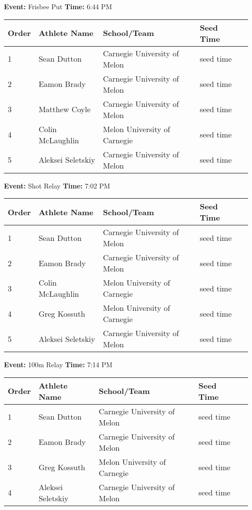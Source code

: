 \documentclass[11pt]{article}
\begin{document}
\textbf{Event:} Frisbee Put \quad \textbf{Time:} 6:44 PM 

\vspace{1em}
\begin{tabular}{@{}lllll@{}}
\toprule

\textbf{Order} & \textbf{Athlete Name} & \textbf{School/Team} & \textbf{Seed Time} \\
\midrule
1 & Sean Dutton & Carnegie University of Melon & seed time &\\
2 & Eamon Brady & Carnegie University of Melon & seed time &\\
3 & Matthew Coyle & Carnegie University of Melon & seed time &\\
4 & Colin McLaughlin & Melon University of Carnegie & seed time &\\
5 & Aleksei Seletskiy & Carnegie University of Melon & seed time &\\
\bottomrule
\end{tabular}
\vspace{2.5em}


\textbf{Event:} Shot Relay \quad \textbf{Time:} 7:02 PM 

\vspace{1em}
\begin{tabular}{@{}lllll@{}}
\toprule

\textbf{Order} & \textbf{Athlete Name} & \textbf{School/Team} & \textbf{Seed Time} \\
\midrule
1 & Sean Dutton & Carnegie University of Melon & seed time &\\
2 & Eamon Brady & Carnegie University of Melon & seed time &\\
3 & Colin McLaughlin & Melon University of Carnegie & seed time &\\
4 & Greg Kossuth & Melon University of Carnegie & seed time &\\
5 & Aleksei Seletskiy & Carnegie University of Melon & seed time &\\
\bottomrule
\end{tabular}
\vspace{2.5em}


\textbf{Event:} 100m Relay \quad \textbf{Time:} 7:14 PM 

\vspace{1em}
\begin{tabular}{@{}lllll@{}}
\toprule

\textbf{Order} & \textbf{Athlete Name} & \textbf{School/Team} & \textbf{Seed Time} \\
\midrule
1 & Sean Dutton & Carnegie University of Melon & seed time &\\
2 & Eamon Brady & Carnegie University of Melon & seed time &\\
3 & Greg Kossuth & Melon University of Carnegie & seed time &\\
4 & Aleksei Seletskiy & Carnegie University of Melon & seed time &\\
\bottomrule
\end{tabular}
\vspace{2.5em}
\end{document}
